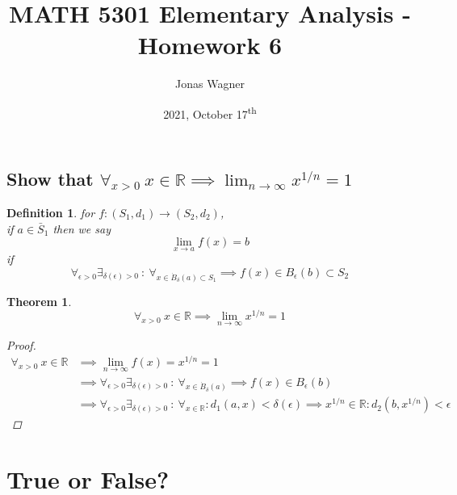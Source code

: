 \documentclass[]{article}
\title{MATH 5301 Elementary Analysis - Homework 6}
\author{Jonas Wagner}
\date{2021, October 17\textsuperscript{th}}
\newcommand{\R}{\mathbb{R}}
\newcommand{\st}{\ : \ }
\newtheorem{definition}{Definition}
\newtheorem{theorem}{Theorem}
\begin{document}
\maketitle

\section{}
\subsection{Show that $\forall_{x > 0} \ x\in \R \implies \lim_{n\to \infty} x^{1/n} = 1$}

\begin{definition}
    for $f : (S_1, d_1) \to (S_2,d_2)$, \\
    if $a \in \bar{S}_1$ then we say $$\lim_{x\to a} f(x) = b$$ if $$\forall_{\epsilon>0} \exists_{\delta(\epsilon) > 0} \st \forall_{x \in \dot{B}_\delta(a) \subset S_1} \implies f(x) \in B_{\epsilon}(b) \subset S_2$$
\end{definition}

\begin{theorem}
    $$\forall_{x > 0} \ x\in \R \implies \lim_{n\to \infty} x^{1/n} = 1$$
    \begin{proof}
        \begin{align*}
            \forall_{x > 0} \ x\in \R 
                &\implies \lim_{n\to \infty} f(x) = x^{1/n} = 1 &\\
            &\implies \forall_{\epsilon>0} \exists_{\delta(\epsilon) > 0} \st \forall_{x \in \dot{B}_\delta(a)} \implies f(x) \in B_{\epsilon}(b)\\
            &\implies \forall_{\epsilon>0} \exists_{\delta(\epsilon) > 0} \st \forall_{x\in \R} : d_1 (a, x) < \delta(\epsilon) \implies x^{1/n} \in \R : d_2(b,x^{1/n}) < \epsilon
        \end{align*}
    \end{proof}
\end{theorem}















\newpage
\section{True or False?}
\end{document}
